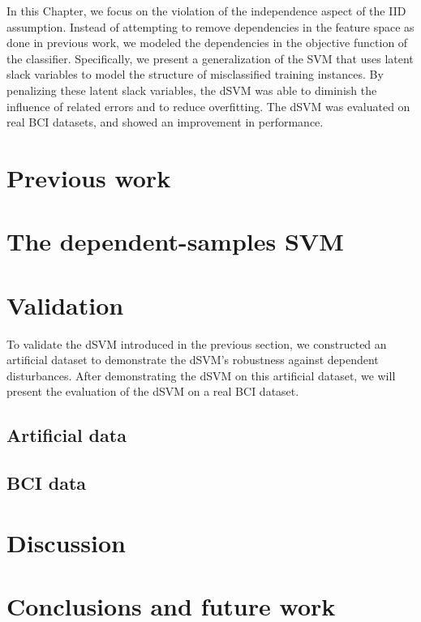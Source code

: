 In this Chapter, we focus on the violation of the independence aspect of the
\ac{IID} assumption. Instead of attempting to remove dependencies in the
feature space as done in previous work, we modeled the dependencies in the
objective function of the classifier. Specifically, we present a generalization
of the \ac{SVM} that uses latent slack variables to model the structure
of misclassified training instances. By penalizing these latent slack
variables, the \ac{dSVM} was able to diminish the influence of related errors
and to reduce overfitting. The \ac{dSVM} was evaluated on real \ac{BCI}
datasets, and showed an improvement in performance.

\section{Previous work}


\section{The dependent-samples SVM}


\section{Validation}
To validate the \ac{dSVM} introduced in the previous section, we constructed an
artificial dataset to demonstrate the \ac{dSVM}'s robustness against dependent
disturbances. After demonstrating the \ac{dSVM} on this artificial dataset, we
will present the evaluation of the \ac{dSVM} on a real \ac{BCI} dataset.

\subsection{Artificial data}


\subsection{BCI data}


\section{Discussion}


\section{Conclusions and future work}

